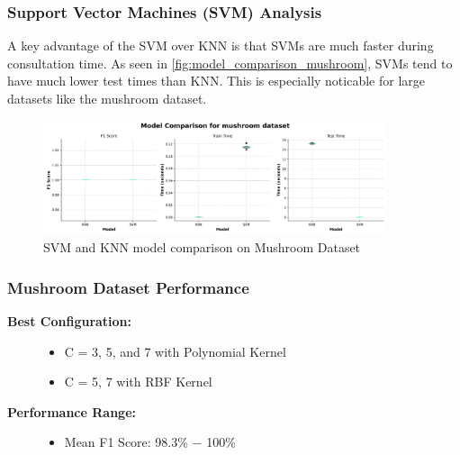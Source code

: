 \subsubsection{Support Vector Machines (SVM) Analysis}
\label{subsubsec:discussion-svm}

A key advantage of the SVM over KNN is that SVMs are much faster during consultation time. As seen in \autoref{fig:model_comparison_mushroom},
SVMs tend to have much lower test times than KNN. This is especially noticable for large datasets like the mushroom dataset.

\begin{figure}
    \centering
    \includegraphics[width=0.9\textwidth]{figures/model_comparison_mushroom.png}
    \caption{SVM and KNN model comparison on Mushroom Dataset}
    \label{fig:model_comparison_mushroom}
\end{figure}

\subsubsection{Mushroom Dataset Performance}



\begin{description}
    \item[\textbf{Best Configuration:}]\leavevmode
        \begin{itemize}
            \item C = 3, 5, and 7 with Polynomial Kernel
            \item C = 5, 7 with RBF Kernel
        \end{itemize}
    
    \item[\textbf{Performance Range:}]\leavevmode
        \begin{itemize}
            \item Mean F1 Score: 98.3\% $-$ 100\%
        \end{itemize}
\end{description}

